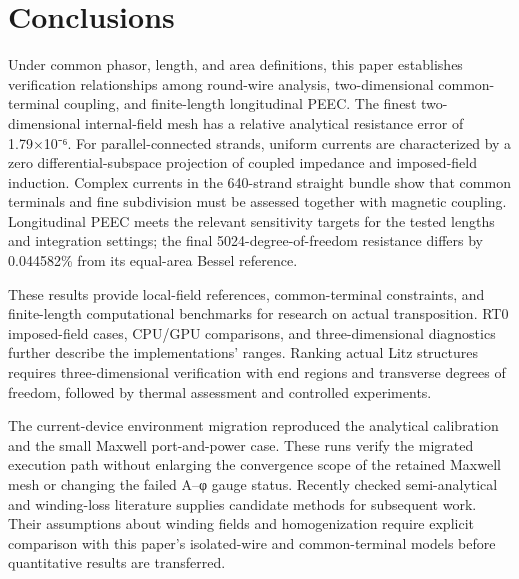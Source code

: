 \section{Conclusions}
\label{chapter:05}

\hypertarget{05.conclusions.p1}{}
Under common phasor, length, and area definitions, this paper establishes verification relationships among round-wire analysis, two-dimensional common-terminal coupling, and finite-length longitudinal PEEC. The finest two-dimensional internal-field mesh has a relative analytical resistance error of 1.79×10⁻⁶. For parallel-connected strands, uniform currents are characterized by a zero differential-subspace projection of coupled impedance and imposed-field induction. Complex currents in the 640-strand straight bundle show that common terminals and fine subdivision must be assessed together with magnetic coupling. Longitudinal PEEC meets the relevant sensitivity targets for the tested lengths and integration settings; the final 5024-degree-of-freedom resistance differs by 0.044582\% from its equal-area Bessel reference.

\hypertarget{05.conclusions.p2}{}
These results provide local-field references, common-terminal constraints, and finite-length computational benchmarks for research on actual transposition. RT0 imposed-field cases, CPU/GPU comparisons, and three-dimensional diagnostics further describe the implementations' ranges. Ranking actual Litz structures requires three-dimensional verification with end regions and transverse degrees of freedom, followed by thermal assessment and controlled experiments.

\hypertarget{05.current.evidence}{}
The current-device environment migration reproduced the analytical calibration and the small Maxwell port-and-power case. These runs verify the migrated execution path without enlarging the convergence scope of the retained Maxwell mesh or changing the failed A–φ gauge status. Recently checked semi-analytical and winding-loss literature supplies candidate methods for subsequent work. Their assumptions about winding fields and homogenization require explicit comparison with this paper's isolated-wire and common-terminal models before quantitative results are transferred. \cite{C01,ZHU2026}
